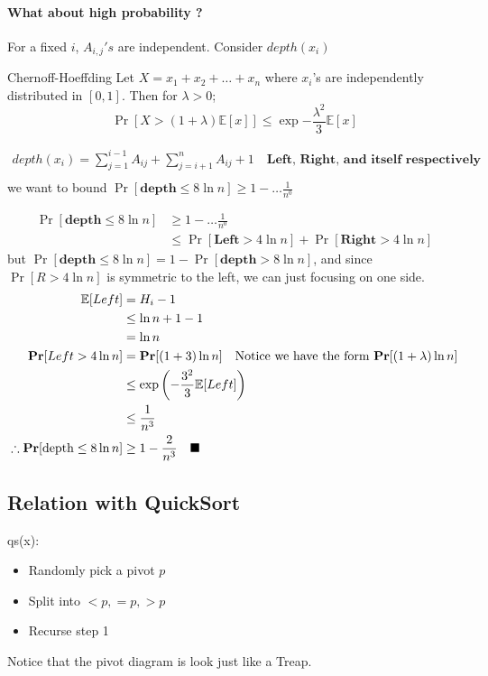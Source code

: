 \documentclass[12pt]{article}
\begin{document}
\paragraph{What about high probability ?} For a fixed $i$, $A_{i,j}'s$ are independent. Consider $depth(x_i)$


\begin{theorem}{Chernoff-Hoeffding}
	Let $X=x_1+x_2+\dots+x_n$ where $x_i$'s are independently distributed in $[0,1]$. Then for $\lambda >0$; 
	$$
	\Pr[X>(1+\lambda)\mathbb{E}[x]]\leq \exp{-\frac{\lambda^2}{3}\mathbb{E}[x]}
	$$
\end{theorem}

\begin{align*}
depth(x_i) = \sum_{j=1}^{i-1}A_{ij} + \sum_{j=i+1}^nA_{ij}+1 \quad\textbf{Left, Right, and itself respectively}\\
\end{align*}
we want to bound $\Pr[\textbf{depth} \leq 8\ln n] \geq 1-\dots\frac1{n^0}$

\begin{align*}
\Pr[\textbf{depth} \leq 8\ln n] &\geq 1-\dots\frac1{n^0}\\
&\leq \Pr[\textbf{Left}>4\ln n] + \Pr[\textbf{Right}>4\ln n]
\end{align*}
but $\Pr[\textbf{depth} \leq 8\ln n] = 1 - \Pr[\textbf{depth} >8\ln n]$, 
and since $\Pr[R>4\ln n] $ is symmetric to the left, we can just focusing on one side.
\begin{align*}
\mathbb{E}[Left] &= H_i-1\\
&\leq \ln n + 1 -1\\
&= \ln n\\
\Pr[Left>4\ln n] &= \Pr[(1+3)\ln n] \quad \textnormal{Notice we have the form }\Pr[(1+\lambda)\ln n]\\
&\leq \exp\left(-\frac{3^2}{3}\mathbb{E}[Left]\right)\\
&\leq \frac1{n^3}\\
\therefore \Pr[\textnormal{depth}\leq 8\ln n] &\geq 1-\frac2{n^3} \quad \blacksquare
\end{align*}

\subsection{Relation with QuickSort}

qs(x):\\
\begin{itemize}
	\item Randomly pick a pivot $p$\\
	\item Split into $<p, =p, >p$\\
	\item Recurse step 1
\end{itemize}
Notice that the pivot diagram is look just like a Treap.\\
\end{document}
